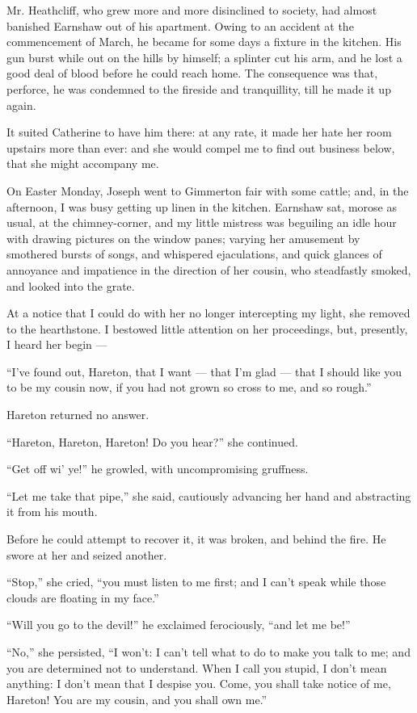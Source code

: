 \par Mr. Heathcliff, who grew more and more disinclined to society, had almost banished Earnshaw out of his apartment. Owing to an accident at the commencement of March, he became for some days a fixture in the kitchen. His gun burst while out on the hills by himself; a splinter cut his arm, and he lost a good deal of blood before he could reach home. The consequence was that, perforce, he was condemned to the fireside and tranquillity, till he made it up again.
\par It suited Catherine to have him there: at any rate, it made her hate her room upstairs more than ever: and she would compel me to find out business below, that she might accompany me.
\par On Easter Monday, Joseph went to Gimmerton fair with some cattle; and, in the afternoon, I was busy getting up linen in the kitchen. Earnshaw sat, morose as usual, at the chimney-corner, and my little mistress was beguiling an idle hour with drawing pictures on the window panes; varying her amusement by smothered bursts of songs, and whispered ejaculations, and quick glances of annoyance and impatience in the direction of her cousin, who steadfastly smoked, and looked into the grate.
\par At a notice that I could do with her no longer intercepting my light, she removed to the hearthstone. I bestowed little attention on her proceedings, but, presently, I heard her begin —
\par “I've found out, Hareton, that I want — that I'm glad — that I should like you to be my cousin now, if you had not grown so cross to me, and so rough.”
\par Hareton returned no answer.
\par “Hareton, Hareton, Hareton! Do you hear?” she continued.
\par “Get off wi' ye!” he growled, with uncompromising gruffness.
\par “Let me take that pipe,” she said, cautiously advancing her hand and abstracting it from his mouth.
\par Before he could attempt to recover it, it was broken, and behind the fire. He swore at her and seized another.
\par “Stop,” she cried, “you must listen to me first; and I can't speak while those clouds are floating in my face.”
\par “Will you go to the devil!” he exclaimed ferociously, “and let me be!”
\par “No,” she persisted, “I won't: I can't tell what to do to make you talk to me; and you are determined not to understand. When I call you stupid, I don't mean anything: I don't mean that I despise you. Come, you shall take notice of me, Hareton! You are my cousin, and you shall own me.”
